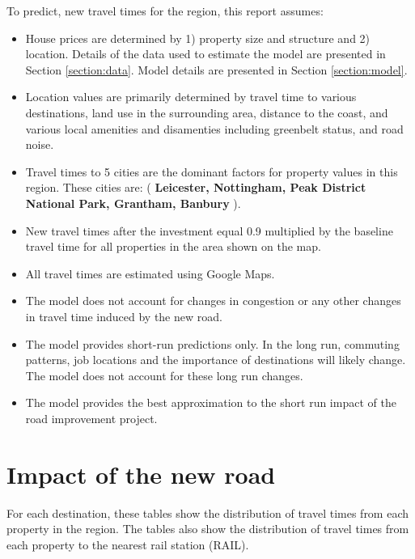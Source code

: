 \documentclass{article}\usepackage[]{graphicx}\usepackage[]{color}
\begin{document}
To predict, new travel times for the region, this report assumes:
\begin{itemize}
\item House prices are determined by 1) property size and structure and 2) location. Details of the data used to estimate the model are presented in Section \ref{section:data}. Model details are presented in Section \ref{section:model}.
\item Location values are primarily determined by travel time to various destinations, land use in the surrounding area, distance to the coast, and various local amenities and disamenties including greenbelt status, and road noise.  
\item Travel times to 5 cities are the dominant factors for property values in this region. These cities are: (\textbf{ Leicester, Nottingham, Peak District National Park, Grantham, Banbury} ).
\item New travel times after the investment equal 0.9 multiplied by the baseline travel time 
for all properties in the area shown on the map. 
\item All travel times are estimated using Google Maps.
\item The model does not account for changes in congestion or any other changes in travel time induced by the new road.
\item The model provides short-run predictions only. In the long run, commuting patterns, job locations and the importance of destinations will likely change. The model does not account for these long run changes.
\item The model provides the best approximation to the short run impact of the road improvement
project.
\end{itemize}

\section{Impact of the new road}

For each destination, these tables show the distribution of travel times from each property in the region. The tables also show the distribution of travel times from each property to the nearest rail station (RAIL).
\end{document}
